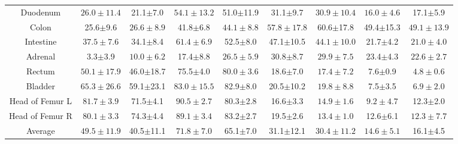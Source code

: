 \begin{table}[t!]
{\begin{subtable}{1\textwidth}
{\begin{tabular}{ccccccccc}
    Duodenum        & $\bm{26.0\pm11.4}$ & 21.1$\pm$7.0      & $\bm{54.1\pm13.2}$ & 51.0$\pm$11.9     & 31.1$\pm$9.7        & $\bm{30.9\pm10.4}$ & $\bm{16.0\pm4.6}$  & 17.1$\pm$5.9       \\
    Colon           & 25.6$\pm$9.6       & $\bm{26.6\pm8.9}$ & 41.8$\pm$6.8       & $\bm{44.1\pm8.8}$ & $\bm{57.8\pm17.8}$  & 60.6$\pm$17.8      & 49.4$\pm$15.3      & $\bm{49.1\pm13.9}$ \\
    Intestine       & $\bm{37.5\pm7.6}$  & 34.1$\pm$8.4      & $\bm{61.4\pm6.9}$  & 52.5$\pm$8.0      & 47.1$\pm$10.5       & $\bm{44.1\pm10.0}$ & 21.7$\pm$4.2       & $\bm{21.0\pm4.0}$  \\
    Adrenal         & 3.3$\pm$3.9        & $\bm{10.0\pm6.2}$ & 17.4$\pm$8.8       & $\bm{26.5\pm5.9}$ & 30.8$\pm$8.7        & $\bm{29.9\pm7.5}$  & 23.4$\pm$4.3       & $\bm{22.6\pm2.7}$  \\
    Rectum          & $\bm{50.1\pm17.9}$ & 46.0$\pm$18.7     & 75.5$\pm$4.0       & $\bm{80.0\pm3.6}$ & 18.6$\pm$7.0        & $\bm{17.4\pm7.2}$  & 7.6$\pm$0.9        & $\bm{4.8\pm0.6}$   \\
    Bladder         & $\bm{65.3\pm26.6}$ & 59.1$\pm$23.1     & $\bm{83.0\pm15.5}$ & 82.9$\pm$8.0      & 20.5$\pm$10.2       & $\bm{19.8\pm8.8}$  & 7.5$\pm$3.5        & $\bm{6.9\pm2.0}$   \\
    Head of Femur L & $\bm{81.7\pm3.9}$  & 71.5$\pm$4.1      & $\bm{90.5\pm2.7}$  & 80.3$\pm$2.8      & 16.6$\pm$3.3        & $\bm{14.9\pm1.6}$  & $\bm{9.2\pm4.7}$   & 12.3$\pm$2.0       \\
    Head of Femur R & $\bm{80.1\pm3.3}$  & 74.3$\pm$4.4      & $\bm{89.1\pm3.4}$  & 83.2$\pm$2.7      & 19.5$\pm$2.6        & $\bm{13.4\pm1.0}$  & 12.6$\pm$6.1       & $\bm{12.3\pm7.7}$  \\ \hline
    Average         & $\bm{49.5\pm11.9}$ & 40.5$\pm$11.1     & $\bm{71.8\pm7.0}$  & 65.1$\pm$7.0      & 31.1$\pm$12.1       & $\bm{30.4\pm11.2}$ & $\bm{14.6\pm5.1}$  & 16.1$\pm$4.5       \\
    \bottomrule[1.5pt]
    \end{tabular}}
    \end{subtable}
    }
    \label{tab:4}
    \end{table}